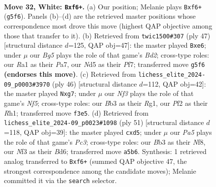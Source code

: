 \documentclass[11pt]{article}
\begin{document}
\clearpage

\begin{figure}[p]\centering
\begin{subfigure}{0.46\textwidth}\centering
\resizebox{\linewidth}{!}{%
\newchessgame
\chessboard[
  setfen={r2kr3/2pb4/pp1n1b2/P2N1pB1/4p2R/1B3N2/1P2KPP1/R7 w - - 2 32},
  showmover=false,
  pgfstyle=straightmove, color=movearrow, markmove={g5-f6}
]}
\caption{}
\end{subfigure}\hfill
\begin{subfigure}{0.46\textwidth}\centering
\resizebox{\linewidth}{!}{%
\newchessgame
\chessboard[
  setfen={2r3k1/p2b1ppp/p1n1P3/8/1P6/3r1N1P/1B3PP1/2R1R1K1 b - - 0 24},
  showmover=false,
  pgfstyle=straightmove, color=movearrow, markmove={d7-e6}
]}
\caption{}
\end{subfigure}
\\[4pt]
\begin{subfigure}{0.46\textwidth}\centering
\resizebox{\linewidth}{!}{%
\newchessgame
\chessboard[
  setfen={4r1kr/1bp3bp/1p2p1n1/p3pN2/2P1N3/P3B3/1Pn1BP2/1K4RR w - - 0 24},
  showmover=false,
  pgfstyle=straightmove, color=movearrow, markmove={f5-g7}
]}
\caption{}
\end{subfigure}\hfill
\begin{subfigure}{0.46\textwidth}\centering
\resizebox{\linewidth}{!}{%
\newchessgame
\chessboard[
  setfen={4rn2/pp4k1/2pbpn2/3P1r2/2P4p/1BB4P/PP2RPP1/4R1K1 b - - 0 26},
  showmover=false,
  pgfstyle=straightmove, color=movearrow, markmove={c6-d5}
]}
\caption{}
\end{subfigure}
\caption{\textbf{Move 32, White: \texttt{Bxf6+}.} (a) Our position; Melanie plays \texttt{Bxf6+} (\texttt{g5f6}). Panels (b)--(d) are the retrieved master positions whose correspondence most drove this move (highest QAP objective among those that transfer to it). (b) Retrieved from \texttt{twic1500\#307} (ply 47) [structural distance $d$=125, QAP obj=47]: the master played \texttt{Bxe6}; under $\mu$ our \emph{Bg5} plays the role of that game's \emph{Bd2}; cross-type roles: our \emph{R}a1 as their \emph{P}a7, our \emph{N}d5 as their \emph{P}f7; transferred move \texttt{g5f6} \textbf{(endorses this move)}. (c) Retrieved from \texttt{lichess\_elite\_2024-09\_p0003\#3970} (ply 46) [structural distance $d$=112, QAP obj=42]: the master played \texttt{Nxg7}; under $\mu$ our \emph{Nf3} plays the role of that game's \emph{Nf5}; cross-type roles: our \emph{B}b3 as their \emph{R}g1, our \emph{P}f2 as their \emph{R}h1; transferred move \texttt{f3e5}. (d) Retrieved from \texttt{lichess\_elite\_2024-09\_p0023\#1098} (ply 51) [structural distance $d$=118, QAP obj=39]: the master played \texttt{cxd5}; under $\mu$ our \emph{Pa5} plays the role of that game's \emph{Pc3}; cross-type roles: our \emph{B}b3 as their \emph{N}f8, our \emph{N}f3 as their \emph{B}d6; transferred move \texttt{a5b6}. Synthesis: 1 retrieved analog transferred to \texttt{Bxf6+} (summed QAP objective 47, the strongest correspondence among the candidate moves); Melanie committed it via the \texttt{search} selector.}
\label{fig:thought-m62}
\end{figure}
\end{document}
